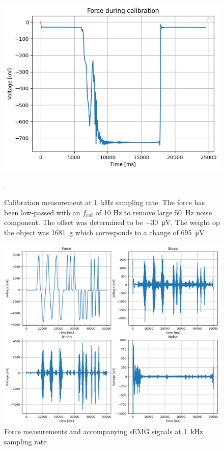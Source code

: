 \begin{figure}[h!t]
	\begin{center}
		\includegraphics[width=0.8\columnwidth]{images/measurement_calibratie3_1k.png}
	\end{center}
	\caption{Calibration measurement at \SI{1}{\kilo\hertz} sampling rate. The force has been low-passed with an $f_{cut}$ of 10 Hz to remove large \SI{50}{\hertz} noise component. The offset was determined to be \SI{-30}{\micro\volt}. The weight op the object was \SI{1681}{\gram} which corresponds to a change of \SI{695}{\micro\volt}}.
	\label{fig:calibration_1k}
\end{figure}

\begin{figure}[h!t]
	\begin{center}
		\includegraphics[width=1.0\columnwidth]{images/measurement_meting3_1k.png}
	\end{center}
	\caption{Force measurements and accompanying sEMG signals at \SI{1}{\kilo\hertz} sampling rate}
	\label{fig:measurement_1k}
\end{figure}

